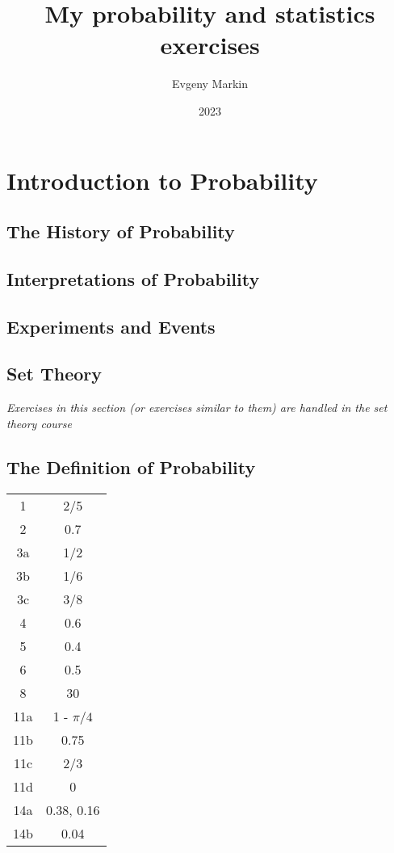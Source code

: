 \documentclass[11pt,oneside,titlepage]{book}
\title{My probability and statistics exercises}
\author{Evgeny Markin}
\date{2023}
\begin{document}
\maketitle
\tableofcontents

\chapter{Introduction to Probability}

\section{The History of Probability}

\section{Interpretations of Probability}

\section{Experiments and Events}

\section{Set Theory }

\textit{Exercises in this section (or exercises similar to them) are handled in the set theory
  course}

\section{The Definition of Probability}

\begin{tabular}[center]{||c | c|| }
  \hline
  1 & 2/5 \\
  2 & 0.7 \\
  3a & 1/2 \\
  3b & 1/6 \\
  3c & 3/8 \\
  4 & 0.6 \\
  5 & 0.4 \\
  6 & 0.5 \\
  8 & 30 \\
  11a & 1 - $\pi/4$ \\
  11b & 0.75 \\
  11c & 2/3\\
  11d & 0 \\
  14a & 0.38, 0.16 \\
  14b & 0.04 \\
  \hline 
\end{tabular}
\end{document}
